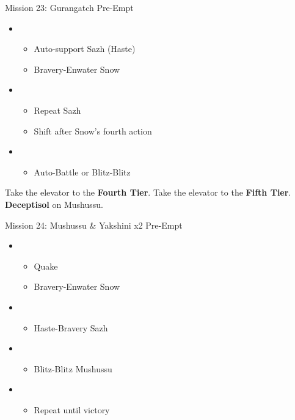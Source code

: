 	\begin{battle}[0:22]{Mission 23: Gurangatch Pre-Empt}
		\begin{itemize}
			\item \first
			      \begin{itemize}
				      \item Auto-support Sazh (Haste)
				      \item Bravery-Enwater Snow
			      \end{itemize}
			\item \fifth
			      \begin{itemize}
				      \item Repeat Sazh
				      \item Shift after Snow's fourth action
			      \end{itemize}
			\item \sixth
			      \begin{itemize}
				      \item Auto-Battle or Blitz-Blitz
			      \end{itemize}
		\end{itemize}
	\end{battle}

	Take the elevator to the \textbf{Fourth Tier}.
	Take the elevator to the \textbf{Fifth Tier}.
	\textbf{Deceptisol} on Mushussu.
	\vfill
	\ 
	\begin{battle}[0:28]{Mission 24: Mushussu \& Yakshini x2 Pre-Empt}
		\begin{itemize}
			\item \first
			      \begin{itemize}
				      \item Quake
				      \item Bravery-Enwater Snow
			      \end{itemize}
			\item \fifth
			      \begin{itemize}
				      \item Haste-Bravery Sazh
			      \end{itemize}
			\item \fourth
			      \begin{itemize}
				      \item Blitz-Blitz Mushussu
			      \end{itemize}
			\item \sixth
			      \begin{itemize}
				      \item Repeat until victory
			      \end{itemize}
		\end{itemize}
	\end{battle}


